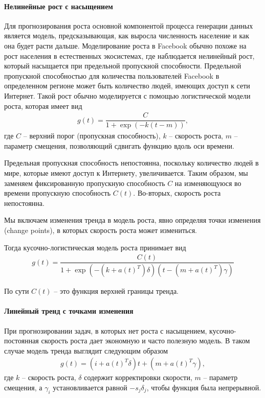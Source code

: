 \documentclass[%
	11pt,
	a4paper,
	utf8,
		]{article}
\begin{document}
\paragraph{Нелинейные рост с насыщением}

Для прогнозирования роста основной компонентой процесса генерации данных является модель, предсказывающая, как выросла численность население и как она будет расти дальше. Моделирование роста в Facebook обычно похоже на рост населения в естественных экосистемах, где наблюдается нелинейный рост, который насыщается при предельной пропускной способности. Предельной пропускной способностью для количества пользователей Facebook в определенном регионе может быть количество людей, имеющих доступ к сети Интернет. Такой рост обычно моделируется с помощью логистической модели роста, которая имеет вид
\begin{align*}
	g(t) = \dfrac{C}{1 + \exp{(-k (t - m))}},
\end{align*}
где $C$ -- верхний порог (пропускная способность), $k$ -- скорость роста, $m$ -- параметр смещения, позволяющий сдвигать функцию вдоль оси времени.

Предельная пропускная способность непостоянна, поскольку количество людей в мире, которые имеют доступ к Интернету, увеличивается. Таким образом, мы заменяем фиксированную пропускную способность $ C $ на изменяющуюся во времени пропускную способность $C(t)$. Во-вторых, скорость роста непостоянна.

Мы включаем изменения тренда в модель роста, явно определяя точки изменения (change points), в которых скорость роста может измениться.

Тогда кусочно-логистическая модель роста принимает вид \cite[]{gruzdev:time-series-2022}
\begin{align*}
	g(t) = \dfrac{C(t)}{1 + \exp{(-(k + a(t)^T)\delta)} (t - (m + a(t)^T)\gamma) }
\end{align*}

По сути $C(t)$ -- это функция верхней границы тренда.

\paragraph{Линейный тренд с точками изменения}

При прогнозировании задач, в которых нет роста с насыщением, кусочно-постоянная скорость роста дает экономную и часто полезную модель. В таком случае модель тренда выглядит следующим образом
\begin{align*}
	g(t) = (i + a(t)^T \delta) t + (m + a(t)^T \gamma),
\end{align*}
где $k$ -- скорость роста, $\delta$ содержит корректировки скорости, $m$ -- параметр смещения, а $\gamma_i$ установливается равной $-s_j \delta_j$, чтобы функция была непрерывной.
\end{document}
